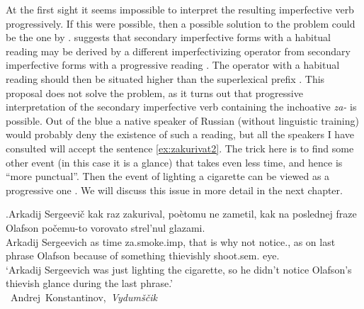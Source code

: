 At the first sight it seems impossible to interpret the resulting imperfective verb  progressively. If this were possible, then a possible solution to the problem could be the one by \citet{Ramchand:04}. \citet{Ramchand:04} suggests that secondary imperfective  forms with a habitual reading  may be derived by a different imperfectivizing operator from secondary imperfective  forms with a progressive reading . The operator with a habitual reading  should then be situated higher than the superlexical prefix . This proposal does not solve the problem, as it turns out that progressive interpretation  of the secondary imperfective  verb  containing the inchoative  \textit{za-}   is possible. Out of the blue a native speaker of Russian (without linguistic training) would probably deny the existence of such a reading, but all the speakers I have consulted will accept the sentence \ref{ex:zakurivat2}. The trick here is to find some other event (in this case it is a glance) that takes even less time, and hence is ``more punctual''. Then the event of lighting a cigarette can be viewed as a progressive one . We will discuss this issue in more detail in the next chapter.

\exg.\label{ex:zakurivat2}Arkadij Sergeevi\v{c} kak raz zakurival, po\`{e}tomu ne zametil, kak na poslednej fraze Olafson po\v{c}emu-to vorovato strel'nul glazami.\\
Arkadij Sergeevich as time za.smoke.imp, {that is why} not notice., as on last phrase Olafson {because of something} thievishly shoot.sem. eye.\\
\trans `Arkadij Sergeevich was just lighting the cigarette, so he didn't notice Olafson's thievish glance during the last phrase.'\\\hbox{}\hfill\hbox{
Andrej Konstantinov, \textit{Vydum\v{s}\v{c}ik}}

